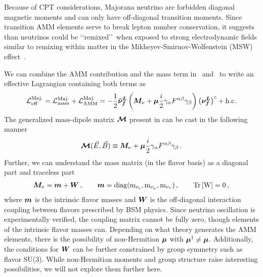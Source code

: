 Because of CPT considerations, Majorana neutrino are forbidden diagonal magnetic moments and can only have off-diagonal transition moments. Since transition AMM elements serve to break lepton number conservation, it suggests than neutrinos could be \lq\lq remixed\rq\rq\ when exposed to strong electrodynamic fields similar to remixing within matter in the Mikheyev-Smirnov-Wolfenstein (MSW) effect~\citep{wolfenstein1978neutrino,mikheev1985resonance,bethe1986possible,greiner2009gauge}. 

We can combine the AMM contribution and the mass term in~ and~ to write an effective Lagrangian containing both terms as
\begin{align}
	\label{massmom:1}
    \mathcal{L}_\mathrm{eff}^\mathrm{Maj.}=\mathcal{L}_\mathrm{mass}^\mathrm{Maj.} + \mathcal{L}_\mathrm{AMM}^\mathrm{Maj.}=-\frac{1}{2}\boldsymbol{\bar{\nu}_{f}^{L}}\left(\boldsymbol{M}_{\nu}+\boldsymbol{\mu}\frac{i}{2}\gamma_{\alpha}F^{\alpha\beta}\gamma_{\beta}\right)\left(\boldsymbol{\nu_{f}^{L}}\right)^{c}+\rm{h.c.}
\end{align}
The generalized mass-dipole matrix $\boldsymbol{\mathcal M}$ present in  can be cast in the following manner
\begin{align}
	\label{massmom:2}
    {\boldsymbol{\mathcal{M}}}(\vec{E},\vec{B})\equiv\boldsymbol{M}_{\nu}+\boldsymbol{\mu}\frac{i}{2}\gamma_{\alpha}F^{\alpha\beta}\gamma_{\beta}\,.
\end{align}
Further, we can understand the mass matrix (in the flavor basis) as a diagonal part and traceless part
\begin{align}
	\label{massmom:3}
    \boldsymbol{M}_{\nu}=\boldsymbol{m}+\boldsymbol{W}\,,\qquad
    \boldsymbol{m}=\rm{diag}(m_{\nu_{e}},m_{\nu_{\mu}},m_{\nu_{\tau}})\,,\qquad
    \rm{Tr}\left[\boldsymbol{W}\right] = 0 \,,
\end{align}
where $\boldsymbol{m}$ is the intrinsic flavor masses and $\boldsymbol{W}$ is the off-diagonal interaction coupling between flavors prescribed by BSM physics. Since neutrino oscillation is experimentally verified, the coupling matrix cannot be fully zero, though elements of the intrinsic flavor masses can. Depending on what theory generates the AMM elements, there is the possibility of non-Hermitian $\boldsymbol{\mu}$ with $\boldsymbol{\mu}^{\dagger}\neq\boldsymbol{\mu}$. Additionally, the conditions for $\boldsymbol{W}$ can be further constrained by group symmetry such as flavor SU(3). While non-Hermitian moments and group structure raise interesting possibilities, we will not explore them further here. 

